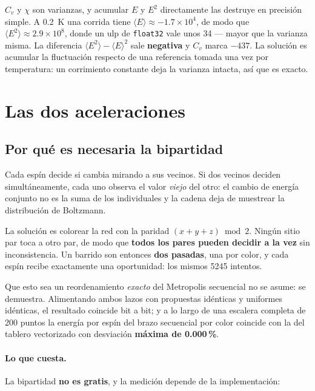\documentclass[11pt,a4paper]{article}
\begin{document}
$C_v$ y $\chi$ son varianzas, y acumular $E$ y $E^2$ directamente las destruye en
precisi\'on simple. A \SI{0.2}{\kelvin} una corrida tiene
$\langle E\rangle \approx -1.7\times10^4$, de modo que
$\langle E^2\rangle \approx 2.9\times10^8$, donde un ulp de \texttt{float32} vale
unos 34 --- mayor que la varianza misma. La diferencia
$\langle E^2\rangle - \langle E\rangle^2$ sale \textbf{negativa} y $C_v$ marca
$-437$. La soluci\'on es acumular la fluctuaci\'on respecto de una referencia
tomada una vez por temperatura: un corrimiento constante deja la varianza
intacta, as\'i que es exacto.

\section{Las dos aceleraciones}

\subsection{Por qu\'e es necesaria la bipartidad}

Cada esp\'in decide si cambia mirando a sus vecinos. Si dos vecinos deciden
simult\'aneamente, cada uno observa el valor \emph{viejo} del otro: el cambio de
energ\'ia conjunto no es la suma de los individuales y la cadena deja de muestrear
la distribuci\'on de Boltzmann.

La soluci\'on es colorear la red con la paridad $(x+y+z)\bmod 2$. Ning\'un sitio
par toca a otro par, de modo que \textbf{todos los pares pueden decidir a la vez}
sin inconsistencia. Un barrido son entonces \textbf{dos pasadas}, una por color,
y cada esp\'in recibe exactamente una oportunidad: los mismos \num{5245} intentos.

Que esto sea un reordenamiento \emph{exacto} del Metropolis secuencial no se
asume: se demuestra. Alimentando ambos lazos con propuestas id\'enticas y
uniformes id\'enticas, el resultado coincide bit a bit; y a lo largo de una
escalera completa de 200 puntos la energ\'ia por esp\'in del brazo secuencial por
color coincide con la del tablero vectorizado con desviaci\'on
\textbf{m\'axima de 0.000\,\%}.

\paragraph{Lo que cuesta.} La bipartidad \textbf{no es gratis}, y la medici\'on
depende de la implementaci\'on:
\end{document}

